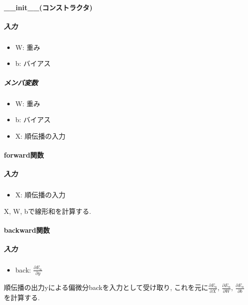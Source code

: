 \documentclass[a4j, titlepage]{jarticle}
\begin{document}
        \paragraph*{\_\_init\_\_(コンストラクタ)}
            \subparagraph*{入力}
            \begin{itemize}
                \item W: 重み
                \item b: バイアス
            \end{itemize}
            \subparagraph*{メンバ変数}
            \begin{itemize}
                \item W: 重み
                \item b: バイアス
                \item X: 順伝播の入力
            \end{itemize}
        \paragraph*{forward関数}
            \subparagraph*{入力}
            \begin{itemize}
                \item X: 順伝播の入力
            \end{itemize}
            X, W, bで線形和を計算する.
        \paragraph*{backward関数}
            \subparagraph*{入力}
            \begin{itemize}
                \item back: \(\displaystyle \frac{\partial E_n}{\partial y}\)
            \end{itemize}
            順伝播の出力yによる偏微分backを入力として受け取り, これを元に\(\displaystyle \frac{\partial E_n}{\partial X}\), \(\displaystyle \frac{\partial E_n}{\partial W}\), \(\displaystyle \frac{\partial E_n}{\partial b}\)を計算する. 
\end{document}
